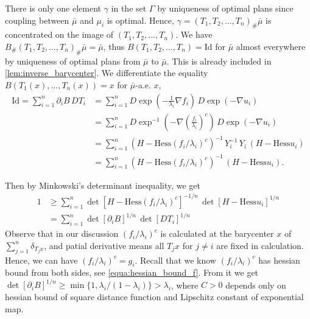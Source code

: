 There is only one element $\gamma$ in the set $\Gamma$ by uniqueness of optimal plans
since coupling between $\bar{\mu}$ and $\mu_i$ is optimal.
Hence, $\gamma = (T_1, T_2, \ldots, T_n)_{\#}\bar{\mu}$
	is concentrated on the image of $(T_1, T_2, \ldots, T_n)$.
We have $B_{\#}(T_1, T_2, \ldots, T_n)_{\#}\bar{\mu}=\bar{\mu}$,
thus $B(T_1, T_2, \ldots, T_n) = \text{Id}$ for $\bar{\mu}$ almost everywhere
by uniqueness of optimal plans from $\bar{\mu}$ to $\bar{\mu}$.
This is already included in \cref{lem:inverse_barycenter}.
We differentiate the equality $B(T_1(x), \ldots, T_n(x))=x$ for $\bar{\mu}$-a.e. $x$,
\begin{align*}
	\text{Id} =\sum_{i=1}^n \partial_i B\, DT_i
	 & =\sum_{i=1}^n D \exp(-\frac{1}{\lambda_i}\nabla f_i) \, D \exp(-\nabla u_i)                     \\
	 & =\sum_{i=1}^n D \exp^{-1}(-\nabla \left( \frac{f_i}{\lambda_i}\right)^c) \, D \exp(-\nabla u_i) \\
	 & =\sum_{i=1}^n(H-\text{Hess}(f_i / \lambda_i)^c)^{-1}\,Y_i^{-1}\,
	Y_i\,(H-\text{Hess} u_i)                                                                           \\
	 & =\sum_{i=1}^n(H-\text{Hess}(f_i / \lambda_i)^c)^{-1}\,
	(H-\text{Hess}u_i) .
\end{align*}

Then by Minkowski's determinant inequality, we get
\begin{align*}
	1 & \geq \sum_{i=1}^{n} \det [H-\text{Hess}(f_i/\lambda_i)^c]^{-1/n}\,\det[H-\text{Hess}u_i]^{1/n} \\
	  & =\sum_{i=1}^n \det[\partial_i B]^{1/n}\,\det[DT_i]^{1/n}
\end{align*}
Observe that in our discussion $(f_i / \lambda_i)^c$ is calculated at the barycenter $x$ of $\sum_{j=1}^{n} \delta_{T_j x}$,
and patial derivative means all $T_j x$ for $ j \ne i$ are fixed in calculation.
Hence, we can have $(f_i / \lambda_i)^c = g_i$.
Recall that we know $(f_i / \lambda_i)^c$ has hessian bound from both sides, see \cref{equa:hessian_bound_f}.
From it we get $\det[\partial_i B]^{1/n} \geq \min \{1, \lambda_i / (1 - \lambda_i)\} > \lambda_i$,
where $C > 0$ depends only on hessian bound of square distance function and Lipschitz constant of exponential map.

